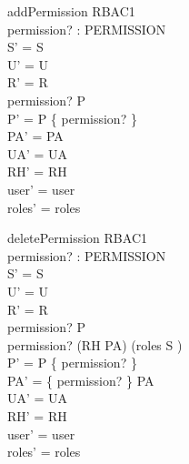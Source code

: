 \begin{zedgroup}
  \begin{schema}{addPermission}
    \Delta RBAC1\\
    permission? : PERMISSION\\
    \where
    S' = S\\
    U' = U\\
    R' = R\\
    permission? \notin P\\
    P' = P \cup \{ permission? \}\\
    PA' = PA\\
    UA' = UA\\
    RH' = RH\\
    user' = user\\
    roles' = roles\\
  \end{schema}
  \begin{schema}{deletePermission}
    \Delta RBAC1\\
    permission? : PERMISSION\\
    \where
    S' = S\\
    U' = U\\
    R' = R\\
    permission? \in P\\
    permission? \notin (RH \comp PA\inv) \limg \bigcup(roles \limg S \rimg) \rimg\\
    P' = P  \setminus \{ permission? \}\\
    PA' = \{ permission? \} \ndres PA\\
    UA' = UA\\
    RH' = RH\\
    user' = user\\
    roles' = roles\\
  \end{schema}
\end{zedgroup}  

